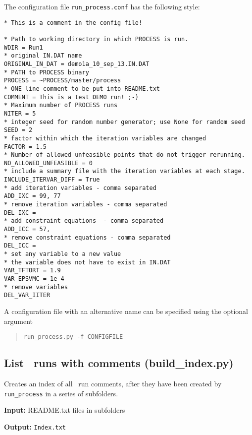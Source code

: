 The configuration file \texttt{run\_process.conf} has the following style:
\begin{framed}
\begin{verbatim}
* This is a comment in the config file!

* Path to working directory in which PROCESS is run.
WDIR = Run1
* original IN.DAT name
ORIGINAL_IN_DAT = demo1a_10_sep_13.IN.DAT
* PATH to PROCESS binary
PROCESS = ~PROCESS/master/process
* ONE line comment to be put into README.txt
COMMENT = This is a test DEMO run! ;-)
* Maximum number of PROCESS runs
NITER = 5
* integer seed for random number generator; use None for random seed
SEED = 2
* factor within which the iteration variables are changed
FACTOR = 1.5
* Number of allowed unfeasible points that do not trigger rerunning.
NO_ALLOWED_UNFEASIBLE = 0
* include a summary file with the iteration variables at each stage.
INCLUDE_ITERVAR_DIFF = True
* add iteration variables - comma separated
ADD_IXC = 99, 77
* remove iteration variables - comma separated
DEL_IXC =
* add constraint equations  - comma separated
ADD_ICC = 57,
* remove constraint equations - comma separated
DEL_ICC =
* set any variable to a new value
* the variable does not have to exist in IN.DAT
VAR_TFTORT = 1.9
VAR_EPSVMC = 1e-4
* remove variables
DEL_VAR_IITER
\end{verbatim}
\end{framed}
A configuration file with an alternative name can be specified using the optional argument
\begin{quote}
\begin{verbatim}
run_process.py -f CONFIGFILE
\end{verbatim}
\end{quote}

\subsection{List \process\ runs with comments (build\_index.py)}

Creates an index of all \process\ run comments, after they have been created by \texttt{run\_process} in a series of subfolders.

\begin{description}
\item{\textbf{Input:}}
README.txt files in subfolders

\item{\textbf{Output:}}
\verb|Index.txt|
\end{description}

